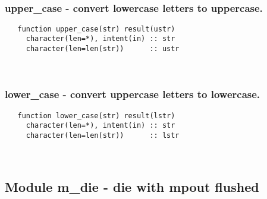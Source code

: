  
\mbox{}\hrulefill\ 
 

  \subsubsection{upper\_case - convert lowercase letters to uppercase.}

\begin{verbatim} 
   function upper_case(str) result(ustr)
     character(len=*), intent(in) :: str
     character(len=len(str))      :: ustr
 \end{verbatim}%
 
 
\mbox{}\hrulefill\ 
 
  \subsubsection{lower\_case - convert uppercase letters to lowercase.}

\begin{verbatim} 
   function lower_case(str) result(lstr)
     character(len=*), intent(in) :: str
     character(len=len(str))      :: lstr
 \end{verbatim}%
%

 
\mbox{}\hrulefill\ 
 
  \subsection{Module m\_die - die with mpout flushed }

